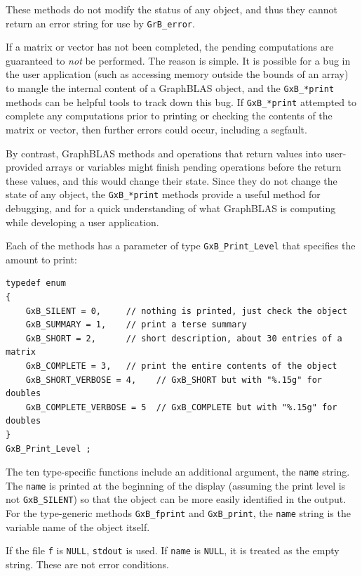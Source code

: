 These methods do not modify the status of any object, and thus they
cannot return an error string for use by \verb'GrB_error'.

If a matrix or vector
has not been completed, the pending computations are guaranteed to {\em not} be
performed. The reason is simple.  It is possible for a bug in the user
application (such as accessing memory outside the bounds of an array) to mangle
the internal content of a GraphBLAS object, and the \verb'GxB_*print' methods
can be helpful tools to track down this bug.  If \verb'GxB_*print' attempted to
complete any computations prior to printing or checking the contents of the
matrix or vector, then further errors could occur, including a segfault.

By contrast, GraphBLAS methods and operations that return values into
user-provided arrays or variables might finish pending operations before the
return these values, and this would change their state.  Since they do not
change the state of any object, the \verb'GxB_*print' methods provide a useful
method for debugging, and for a quick understanding of what GraphBLAS is
computing while developing a user application.

Each of the methods has a parameter of type \verb'GxB_Print_Level' that
specifies the amount to print:

{\footnotesize
\begin{verbatim}
typedef enum
{
    GxB_SILENT = 0,     // nothing is printed, just check the object
    GxB_SUMMARY = 1,    // print a terse summary
    GxB_SHORT = 2,      // short description, about 30 entries of a matrix
    GxB_COMPLETE = 3,   // print the entire contents of the object
    GxB_SHORT_VERBOSE = 4,    // GxB_SHORT but with "%.15g" for doubles
    GxB_COMPLETE_VERBOSE = 5  // GxB_COMPLETE but with "%.15g" for doubles
}
GxB_Print_Level ; \end{verbatim}}

The ten type-specific functions include an additional argument, the
\verb'name' string.  The \verb'name' is printed at the beginning of the display
(assuming the print level is not \verb'GxB_SILENT') so that the object can be
more easily identified in the output.  For the type-generic methods
\verb'GxB_fprint' and \verb'GxB_print', the \verb'name' string is the variable
name of the object itself.

If the file \verb'f' is \verb'NULL', \verb'stdout' is used.
If \verb'name' is \verb'NULL', it is treated
as the empty string.  These are not error conditions.

